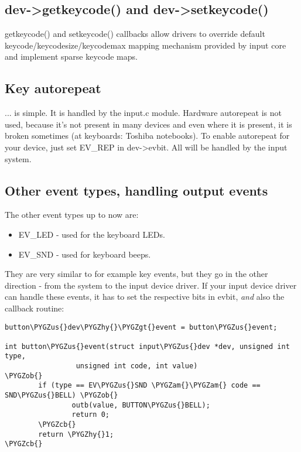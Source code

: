 \documentclass[a4paper,8pt,english]{sphinxmanual}
\def\PYGZus{\char`\_}
\def\PYGZob{\char`\{}
\def\PYGZcb{\char`\}}
\def\PYGZam{\char`\&}
\def\PYGZgt{\char`\>}
\def\PYGZhy{\char`\-}
\begin{document}
\subsection{dev-\textgreater{}getkeycode() and dev-\textgreater{}setkeycode()}
\label{input/input-programming:dev-getkeycode-and-dev-setkeycode}
getkeycode() and setkeycode() callbacks allow drivers to override default
keycode/keycodesize/keycodemax mapping mechanism provided by input core
and implement sparse keycode maps.


\subsection{Key autorepeat}
\label{input/input-programming:key-autorepeat}
... is simple. It is handled by the input.c module. Hardware autorepeat is
not used, because it's not present in many devices and even where it is
present, it is broken sometimes (at keyboards: Toshiba notebooks). To enable
autorepeat for your device, just set EV\_REP in dev-\textgreater{}evbit. All will be
handled by the input system.


\subsection{Other event types, handling output events}
\label{input/input-programming:other-event-types-handling-output-events}
The other event types up to now are:
\begin{itemize}
\item {} 
EV\_LED - used for the keyboard LEDs.

\item {} 
EV\_SND - used for keyboard beeps.

\end{itemize}

They are very similar to for example key events, but they go in the other
direction - from the system to the input device driver. If your input device
driver can handle these events, it has to set the respective bits in evbit,
\emph{and} also the callback routine:

\begin{Verbatim}[commandchars=\\\{\}]
button\PYGZus{}dev\PYGZhy{}\PYGZgt{}event = button\PYGZus{}event;

int button\PYGZus{}event(struct input\PYGZus{}dev *dev, unsigned int type,
                 unsigned int code, int value)
\PYGZob{}
        if (type == EV\PYGZus{}SND \PYGZam{}\PYGZam{} code == SND\PYGZus{}BELL) \PYGZob{}
                outb(value, BUTTON\PYGZus{}BELL);
                return 0;
        \PYGZcb{}
        return \PYGZhy{}1;
\PYGZcb{}
\end{Verbatim}
\end{document}
